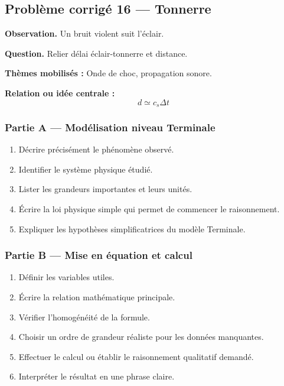 \documentclass[11pt,a4paper]{article}
\begin{document}
\subsection{Problème corrigé 16 — Tonnerre}

\begin{exercicebox}
\textbf{Observation.} Un bruit violent suit l'éclair.

\medskip
\textbf{Question.} Relier délai éclair-tonnerre et distance.

\medskip
\textbf{Thèmes mobilisés :} Onde de choc, propagation sonore.

\medskip
\textbf{Relation ou idée centrale :}
\[
d\simeq c_s\Delta t
\]
\end{exercicebox}

\subsubsection*{Partie A — Modélisation niveau Terminale}

\begin{enumerate}
  \item Décrire précisément le phénomène observé.
  \item Identifier le système physique étudié.
  \item Lister les grandeurs importantes et leurs unités.
  \item Écrire la loi physique simple qui permet de commencer le raisonnement.
  \item Expliquer les hypothèses simplificatrices du modèle Terminale.
\end{enumerate}

\subsubsection*{Partie B — Mise en équation et calcul}

\begin{enumerate}
  \item Définir les variables utiles.
  \item Écrire la relation mathématique principale.
  \item Vérifier l'homogénéité de la formule.
  \item Choisir un ordre de grandeur réaliste pour les données manquantes.
  \item Effectuer le calcul ou établir le raisonnement qualitatif demandé.
  \item Interpréter le résultat en une phrase claire.
\end{enumerate}
\end{document}
